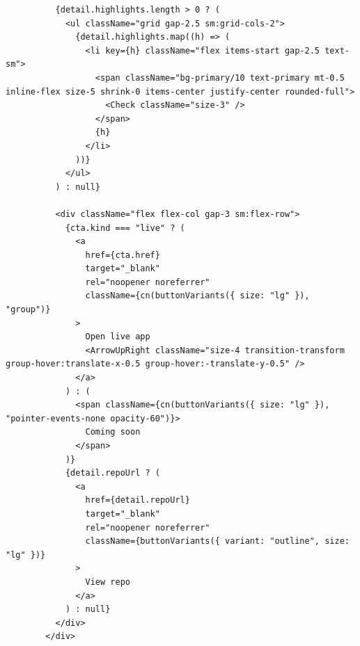 \documentclass[11pt,a4paper]{article}
\begin{document}
\begin{lstlisting}
          {detail.highlights.length > 0 ? (
            <ul className="grid gap-2.5 sm:grid-cols-2">
              {detail.highlights.map((h) => (
                <li key={h} className="flex items-start gap-2.5 text-sm">
                  <span className="bg-primary/10 text-primary mt-0.5 inline-flex size-5 shrink-0 items-center justify-center rounded-full">
                    <Check className="size-3" />
                  </span>
                  {h}
                </li>
              ))}
            </ul>
          ) : null}

          <div className="flex flex-col gap-3 sm:flex-row">
            {cta.kind === "live" ? (
              <a
                href={cta.href}
                target="_blank"
                rel="noopener noreferrer"
                className={cn(buttonVariants({ size: "lg" }), "group")}
              >
                Open live app
                <ArrowUpRight className="size-4 transition-transform group-hover:translate-x-0.5 group-hover:-translate-y-0.5" />
              </a>
            ) : (
              <span className={cn(buttonVariants({ size: "lg" }), "pointer-events-none opacity-60")}>
                Coming soon
              </span>
            )}
            {detail.repoUrl ? (
              <a
                href={detail.repoUrl}
                target="_blank"
                rel="noopener noreferrer"
                className={buttonVariants({ variant: "outline", size: "lg" })}
              >
                View repo
              </a>
            ) : null}
          </div>
        </div>


\end{lstlisting}
\end{document}

